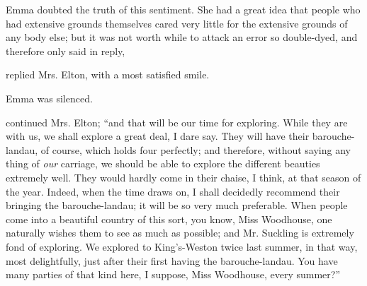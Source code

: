 Emma doubted the truth of this sentiment. She had a great idea that people who had extensive grounds themselves cared very little for the extensive grounds of any body else; but it was not worth while to attack an error so double-dyed, and therefore only said in reply,




 replied Mrs. Elton, with a most satisfied smile. 

Emma was silenced.

 continued Mrs. Elton; “and that will be our time for exploring. While they are with us, we shall explore a great deal, I dare say. They will have their barouche-landau, of course, which holds four perfectly; and therefore, without saying any thing of {\em our} carriage, we should be able to explore the different beauties extremely well. They would hardly come in their chaise, I think, at that season of the year. Indeed, when the time draws on, I shall decidedly recommend their bringing the barouche-landau; it will be so very much preferable. When people come into a beautiful country of this sort, you know, Miss Woodhouse, one naturally wishes them to see as much as possible; and Mr. Suckling is extremely fond of exploring. We explored to King's-Weston twice last summer, in that way, most delightfully, just after their first having the barouche-landau. You have many parties of that kind here, I suppose, Miss Woodhouse, every summer?”


